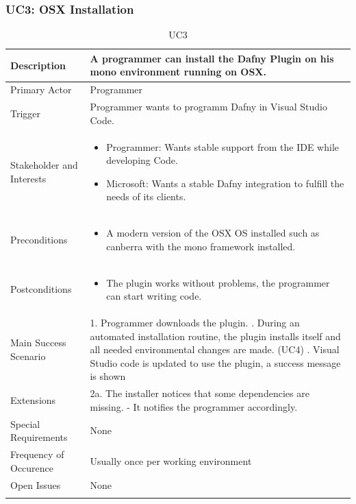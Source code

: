 \subsubsection{UC3: OSX Installation}
\begin{longtable}{l | p{} }
	Description & A programmer can install the Dafny Plugin on his mono environment running on OSX.\\ \hline
	Primary Actor & Programmer\\ \hline
	Trigger & Programmer wants to programm Dafny in Visual Studio Code.\\ \hline
	Stakeholder and Interests & 
	\begin{itemize}
		\item Programmer: Wants stable support from the IDE while developing Code.
		\item Microsoft: Wants a stable Dafny integration to fulfill the needs of its clients.
	\end{itemize} \\ \hline
	Preconditions &
	\begin{itemize}
		\item A modern version of the OSX OS installed such as canberra with the mono framework installed.
	\end{itemize} \\ \hline
	Postconditions &
	\begin{itemize}
		\item The plugin works without problems, the programmer can start writing code.
	\end{itemize} \\ \hline
	Main Success Scenario & 1. Programmer downloads the plugin. \newline
	2. During an automated installation routine, the plugin installs itself and all needed environmental changes are made. (UC4) \newline
	3. Visual Studio code is updated to use the plugin, a success message is shown\\ \hline
	Extensions & 
	2a. The installer notices that some dependencies are missing. \newline 
	- It notifies the programmer accordingly.\\ \hline
	Special Requirements & None\\ \hline
	Frequency of Occurence & Usually once per working environment\\ \hline
	Open Issues & None \\ \hline
	\caption{UC3}
\end{longtable}

